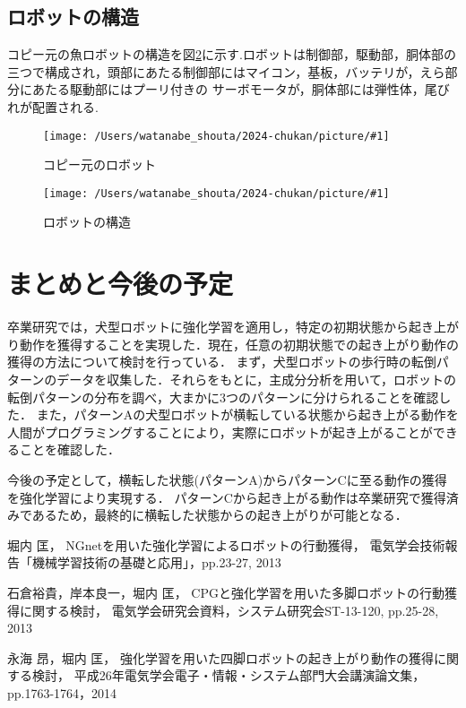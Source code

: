 \documentclass{jarticle}
\newcommand{\setPicture}[1]{\texttt{[image: /Users/watanabe\_shouta/2024-chukan/picture/\#1]}}
\begin{document}
\subsection{ロボットの構造}
コピー元の魚ロボットの構造を図\ref{fig:structure}に示す.ロボットは制御部，駆動部，胴体部の三つで構成され，頭部にあたる制御部にはマイコン，基板，バッテリが，えら部分にあたる駆動部にはプーリ付きの
サーボモータが，胴体部には弾性体，尾びれが配置される.

\newpage

\begin{figure}[t]
   \centering
   \setPicture{fish.jpg}
   \vspace*{-4mm}
   \caption{コピー元のロボット}
   \label{fig:fish-type}
\end{figure}

\begin{figure}[t]
   \centering
   \setPicture{tentativeschematic.png}
   \vspace*{-4mm}
   \caption{ロボットの構造}
   \label{fig:structure}
\end{figure}

\vspace*{-2mm}
\section{まとめと今後の予定}

卒業研究では，犬型ロボットに強化学習を適用し，特定の初期状態から起き上がり動作を獲得することを実現した．現在，任意の初期状態での起き上がり動作の獲得の方法について検討を行っている．
まず，犬型ロボットの歩行時の転倒パターンのデータを収集した．それらをもとに，主成分分析を用いて，ロボットの転倒パターンの分布を調べ，大まかに3つのパターンに分けられることを確認した．
また，パターンAの犬型ロボットが横転している状態から起き上がる動作を人間がプログラミングすることにより，実際にロボットが起き上がることができることを確認した．

今後の予定として，横転した状態(パターンA)からパターンCに至る動作の獲得を強化学習により実現する．
パターンCから起き上がる動作は卒業研究で獲得済みであるため，最終的に横転した状態からの起き上がりが可能となる．

\begin{thebibliography}{99}

堀内 匡，
NGnetを用いた強化学習によるロボットの行動獲得，
電気学会技術報告「機械学習技術の基礎と応用」，pp.23-27, 2013

石倉裕貴，岸本良一，堀内 匡，
CPGと強化学習を用いた多脚ロボットの行動獲得に関する検討，
電気学会研究会資料，システム研究会ST-13-120, pp.25-28, 2013

永海 昂，堀内 匡，
強化学習を用いた四脚ロボットの起き上がり動作の獲得に関する検討，
平成26年電気学会電子・情報・システム部門大会講演論文集，pp.1763-1764，2014

\end{thebibliography}
\end{document}
